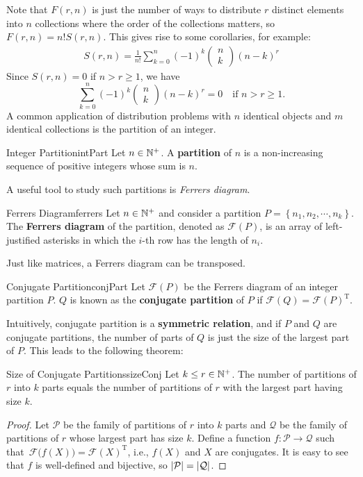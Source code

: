 \documentclass[math]{amznotes}
\theoremstyle{remark}
\newcommand{\0}{\mathbf{0}}
\newcommand{\1}{\mathbf{1}}
\begin{document}
Note that $F(r, n)$ is just the number of ways to distribute $r$ distinct elements into $n$ collections where the order of the collections matters, so $F(r, n) = n!S(r, n)$. This gives rise to some corollaries, for example:
\begin{align*}
    S(r, n) =\frac{1}{n!} \sum_{k = 0}^{n}(-1)^k \begin{pmatrix}
        n \\
        k
    \end{pmatrix}(n - k)^r
\end{align*}
Since $S(r, n) = 0$ if $n > r \geq 1$, we have
\begin{equation*}
    \sum_{k = 0}^{n}(-1)^k \begin{pmatrix}
        n \\
        k
    \end{pmatrix}(n - k)^r = 0 \quad \textrm{if }n > r \geq 1.
\end{equation*}
A common application of distribution problems with $n$ identical objects and $m$ identical collections is the partition of an integer.
\begin{dfnbox}{Integer Partition}{intPart}
    Let $n \in \mathbb{N}^+$. A {\color{red} \textbf{partition}} of $n$ is a non-increasing sequence of positive integers whose sum is $n$. 
\end{dfnbox}
A useful tool to study such partitions is \textit{Ferrers diagram}.
\begin{dfnbox}{Ferrers Diagram}{ferrers}
    Let $n \in \mathbb{N}^+$ and consider a partition $P = \left\{n_1, n_2, \cdots, n_k\right\}$. The {\color{red} \textbf{Ferrers diagram}} of the partition, denoted as $\mathcal{F}(P)$, is an array of left-justified asterisks in which the $i$-th row has the length of $n_i$.
\end{dfnbox}
Just like matrices, a Ferrers diagram can be transposed.
\begin{dfnbox}{Conjugate Partition}{conjPart}
    Let $\mathcal{F}(P)$ be the Ferrers diagram of an integer partition $P$. $Q$ is known as the {\color{red} \textbf{conjugate partition}} of $P$ if $\mathcal{F}(Q) = \mathcal{F}(P)^{\mathrm{T}}$.
\end{dfnbox}
Intuitively, conjugate partition is a \textbf{symmetric relation}, and if $P$ and $Q$ are conjugate partitions, the number of parts of $Q$ is just the size of the largest part of $P$. This leads to the following theorem:
\begin{probox}{Size of Conjugate Partitions}{sizeConj}
    Let $k \leq r \in \mathbb{N}^+$. The number of partitions of $r$ into $k$ parts equals the number of partitions of $r$ with the largest part having size $k$.
    \tcblower   
    \begin{proof}
        Let $\mathcal{P}$ be the family of partitions of $r$ into $k$ parts and $\mathcal{Q}$ be the family of partitions of $r$ whose largest part has size $k$. Define a function $f \colon \mathcal{P} \to \mathcal{Q}$ such that~$\mathcal{F}\bigl(f(X)\bigr) = \mathcal{F}(X)^{\mathrm{T}}$, i.e., $f(X)$ and $X$ are conjugates. It is easy to see that $f$ is well-defined and bijective, so ${\left\lvert {\mathcal{P}} \right\rvert} = {\left\lvert {\mathcal{Q}} \right\rvert}$.
    \end{proof}
\end{probox}
\end{document}
